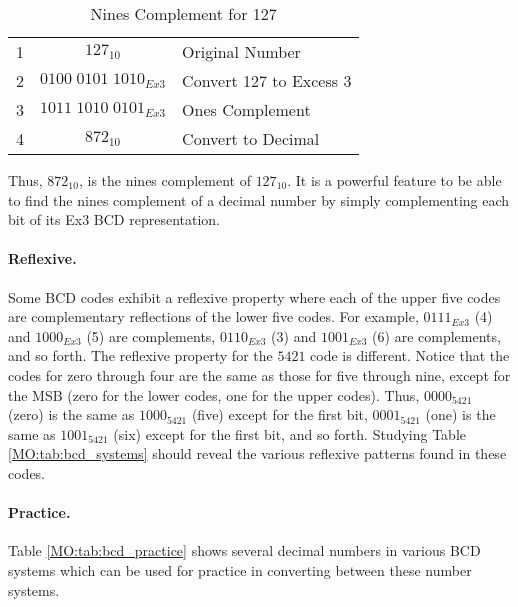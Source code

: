 \begin{table}[H]
  \sffamily
  \newcommand{\head}[1]{\textcolor{white}{\textbf{#1}}}    
  \begin{center}
    \begin{tabular}{ c | c l } 
      \hline
      1 & $ 127_{10} $ & {Original Number} \\
      2 & $ 0100 \; 0101 \; 1010_{Ex3} $ & {Convert 127 to Excess 3} \\
      3 & $ 1011 \; 1010 \; 0101_{Ex3} $ & {Ones Complement} \\
      4 & $ 872_{10} $ & {Convert to Decimal} \\
      \hline  
    \end{tabular}
  \end{center}
  \caption{Nines Complement for 127}
  \label{MO:tab:nines_complement}
\end{table}

Thus, $ 872_{10} $, is the nines complement of $ 127_{10} $. It is a powerful feature to be able to find the nines complement of a decimal number by simply complementing each bit of its Ex3 \ac{BCD} representation. 

\paragraph{Reflexive.} Some \ac{BCD} codes exhibit a reflexive property where each of the upper five codes are complementary reflections of the lower five codes. For example, $ 0111_{Ex3} $ (4) and $ 1000_{Ex3} $ (5) are complements, $ 0110_{Ex3} $ (3) and $ 1001_{Ex3} $ (6) are complements, and so forth. The reflexive property for the $ 5421 $ code is different. Notice that the codes for zero through four are the same as those for five through nine, except for the \ac{MSB} (zero for the lower codes, one for the upper codes). Thus, $ 0000_{5421} $ (zero) is the same as $ 1000_{5421} $ (five) except for the first bit, $ 0001_{5421} $ (one) is the same as $ 1001_{5421} $ (six) except for the first bit, and so forth. Studying Table \ref{MO:tab:bcd_systems} should reveal the various reflexive patterns found in these codes.

\paragraph{Practice.} Table \ref{MO:tab:bcd_practice} shows several decimal numbers in various \ac{BCD} systems which can be used for practice in converting between these number systems.

